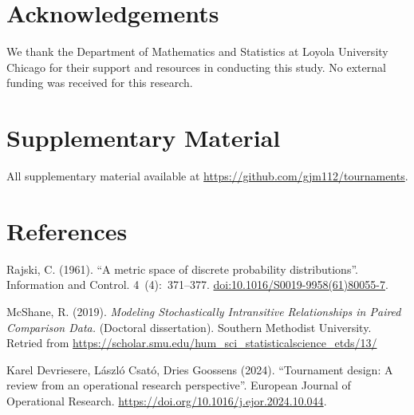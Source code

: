 \documentclass[
  12pt,
]{article}
\begin{document}
\section*{Acknowledgements}\label{acknowledgements}

We thank the Department of Mathematics and Statistics at Loyola
University Chicago for their support and resources in conducting this
study. No external funding was received for this research.

\section*{Supplementary Material}\label{supplementary-material}

All supplementary material available at
\url{https://github.com/gjm112/tournaments}.

\section{References}\label{references}

Rajski, C. (1961). ``A metric space of discrete probability
distributions''. Information and Control. 4~(4):~371--377.
\url{doi:10.1016/S0019-9958(61)80055-7}.

McShane, R. (2019). \emph{Modeling Stochastically Intransitive
Relationships in Paired Comparison Data.} (Doctoral dissertation).
Southern Methodist University. Retried from
\url{https://scholar.smu.edu/hum_sci_statisticalscience_etds/13/}

Karel Devriesere, László Csató, Dries Goossens (2024). ``Tournament
design: A review from an operational research perspective''. European
Journal of Operational Research.
\url{https://doi.org/10.1016/j.ejor.2024.10.044}.
\end{document}
